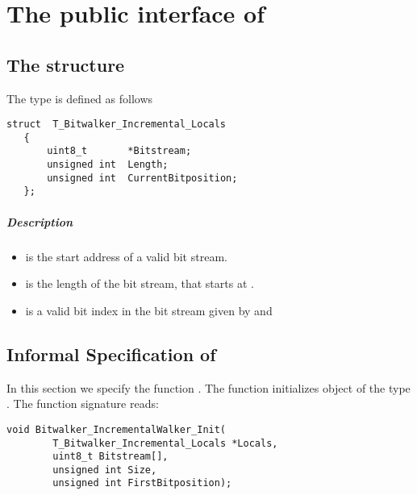 

\chapter{The public interface of \bitwalker}

\section{The structure \bitwalkertype}


The type \bitwalkertype is defined as follows\\[1em]

\begin{lstlisting}[style=acsl-block]
   struct  T_Bitwalker_Incremental_Locals
   {
       uint8_t       *Bitstream;
       unsigned int  Length;
       unsigned int  CurrentBitposition;
   };
\end{lstlisting}


\paragraph{Description}

\begin{itemize}

   \item {} is  the start address of a valid bit stream.
   \item {} is the length of the bit stream, that starts at .
   \item {} is a valid bit index in
              the bit stream given by  and 

\end{itemize}


\clearpage

\section{Informal Specification of }

In this section we specify the function \init.
 The function  initializes object of the type \bitwalkertype.
The function signature reads:


\begin{lstlisting}[style=acsl-block]
void Bitwalker_IncrementalWalker_Init(
        T_Bitwalker_Incremental_Locals *Locals,
        uint8_t Bitstream[],
        unsigned int Size,
        unsigned int FirstBitposition);
\end{lstlisting}


